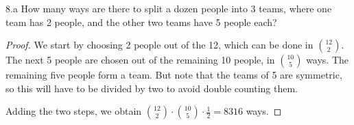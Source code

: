 \begin{exercise}{8.a}
How many ways are there to split a dozen people into 3 teams, where one team has 2 people, and the other two teams have 5 people each?
\end{exercise}

\begin{proof}
    We start by choosing 2 people out of the 12, which can be done in $12 \choose 2$. The next 5 people are chosen out of the remaining 10 people, in $10 \choose 5$ ways. The remaining five people form a team. But note that the teams of 5 are symmetric, so this will have to be divided by two to avoid double counting them.

    Adding the two steps, we obtain ${12 \choose 2} \cdot {10 \choose 5} \cdot \frac{1}{2} = 8316$ ways.
\end{proof}

